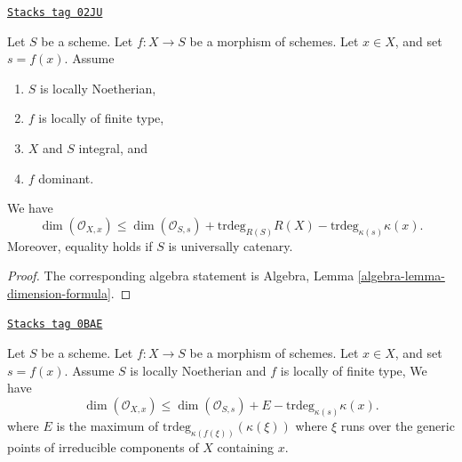 \begin{lemma}
\label{morphisms-lemma-dimension-formula}
\href{https://stacks.math.columbia.edu/tag/02JU}{\texttt{Stacks tag 02JU}}

Let $S$ be a scheme.
Let $f : X \to S$ be a morphism of schemes.
Let $x \in X$, and set $s = f(x)$.
Assume
\begin{enumerate}
\item $S$ is locally Noetherian,
\item $f$ is locally of finite type,
\item $X$ and $S$ integral, and
\item $f$ dominant.
\end{enumerate}
We have
\begin{equation}
\label{equation-dimension-formula}
\dim(\mathcal{O}_{X, x})
\leq
\dim(\mathcal{O}_{S, s}) + \text{trdeg}_{R(S)}R(X)
- \text{trdeg}_{\kappa(s)} \kappa(x).
\end{equation}
Moreover, equality holds if $S$ is universally catenary.
\end{lemma}

\begin{proof}
The corresponding algebra statement is
Algebra, Lemma \ref{algebra-lemma-dimension-formula}.
\end{proof}

\begin{lemma}
\label{morphisms-lemma-dimension-formula-general}
\href{https://stacks.math.columbia.edu/tag/0BAE}{\texttt{Stacks tag 0BAE}}

Let $S$ be a scheme. Let $f : X \to S$ be a morphism of schemes.
Let $x \in X$, and set $s = f(x)$. Assume $S$ is locally Noetherian
and $f$ is locally of finite type,
We have
\begin{equation}
\label{equation-dimension-formula-general}
\dim(\mathcal{O}_{X, x})
\leq
\dim(\mathcal{O}_{S, s}) + E - \text{trdeg}_{\kappa(s)} \kappa(x).
\end{equation}
where $E$ is the maximum of $\text{trdeg}_{\kappa(f(\xi))}(\kappa(\xi))$
where $\xi$ runs over the generic points of irreducible components
of $X$ containing $x$.
\end{lemma}

